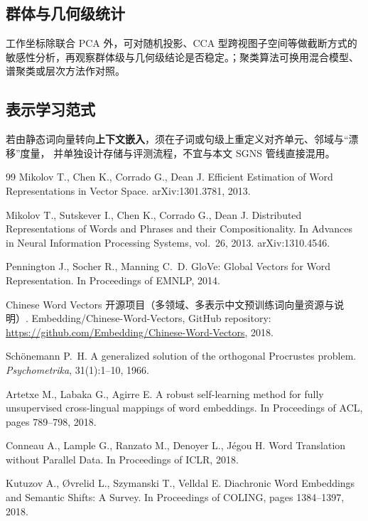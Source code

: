 \documentclass[withoutpreface]{cumcmthesis}
\begin{document}
\subsection{群体与几何级统计}
工作坐标除联合 PCA 外，可对随机投影、CCA 型跨视图子空间等做截断方式的
敏感性分析，再观察群体级与几何级结论是否稳定。；聚类算法可换用混合模型、
谱聚类或层次方法作对照。

\subsection{表示学习范式}
若由静态词向量转向\textbf{上下文嵌入}，须在子词或句级上重定义对齐单元、邻域与“漂移”度量，
并单独设计存储与评测流程，不宜与本文 SGNS 管线直接混用。

\begin{thebibliography}{99}
Mikolov T., Chen K., Corrado G., Dean J.
Efficient Estimation of Word Representations in Vector Space.
arXiv:1301.3781, 2013.

Mikolov T., Sutskever I., Chen K., Corrado G., Dean J.
Distributed Representations of Words and Phrases and their Compositionality.
In Advances in Neural Information Processing Systems, vol.~26, 2013.
arXiv:1310.4546.

Pennington J., Socher R., Manning C.~D.
GloVe: Global Vectors for Word Representation.
In Proceedings of EMNLP, 2014.

Chinese Word Vectors 开源项目（多领域、多表示中文预训练词向量资源与说明）.
Embedding/Chinese-Word-Vectors, GitHub repository:
\url{https://github.com/Embedding/Chinese-Word-Vectors}, 2018.

Sch\"onemann P.~H.
A generalized solution of the orthogonal Procrustes problem.
\emph{Psychometrika}, 31(1):1--10, 1966.

Artetxe M., Labaka G., Agirre E.
A robust self-learning method for fully unsupervised cross-lingual mappings of word embeddings.
In Proceedings of ACL, pages 789--798, 2018.

Conneau A., Lample G., Ranzato M., Denoyer L., J\'egou H.
Word Translation without Parallel Data.
In Proceedings of ICLR, 2018.

Kutuzov A., {\O}vrelid L., Szymanski T., Velldal E.
Diachronic Word Embeddings and Semantic Shifts: A Survey.
In Proceedings of COLING, pages 1384--1397, 2018.


\end{thebibliography}
\end{document}
